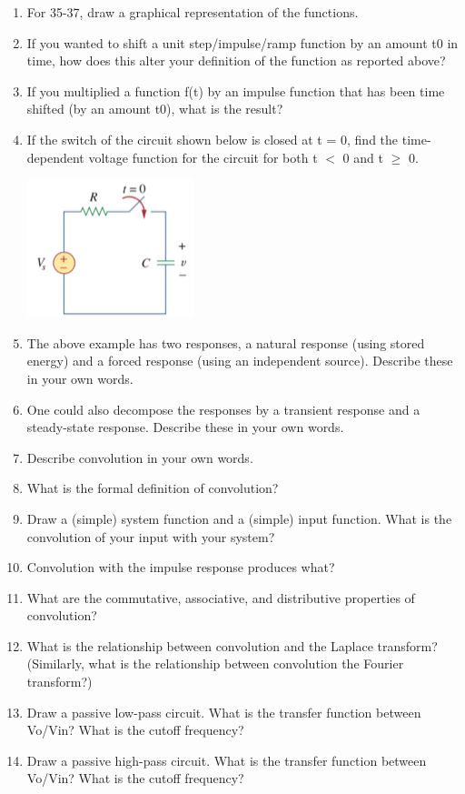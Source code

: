\documentclass[11pt]{book}
\begin{document}
\begin{enumerate}
	\item For 35-37, draw a graphical representation of the functions.
	\item If you wanted to shift a unit step/impulse/ramp function by an amount t0 in time, how does this alter your definition of the function as reported above?
	\item If you multiplied a function f(t) by an impulse function that has been time shifted (by an amount t0), what is the result? 
	\item If the switch of the circuit shown below is closed at t = 0, find the time-dependent voltage function for the circuit for both t $<$ 0 and t $\geq$ 0.
	\begin{center}\includegraphics{figures/q2.05.png}\end{center}
	\item The above example has two responses, a natural response (using stored energy) and a forced response (using an independent source). Describe these in your own words.
	\item One could also decompose the responses by a transient response and a steady-state response. Describe these in your own words.
	\item Describe convolution in your own words.
	\item What is the formal definition of convolution?
	\item Draw a (simple) system function and a (simple) input function. What is the convolution of your input with your system? 
	\item Convolution with the impulse response produces what?
	\item What are the commutative, associative, and distributive properties of convolution?
	\item What is the relationship between convolution and the Laplace transform? (Similarly, what is the relationship between convolution the Fourier transform?)
	\item Draw a passive low-pass circuit. What is the transfer function between Vo/Vin? What is the cutoff frequency?
	\item Draw a passive high-pass circuit. What is the transfer function between Vo/Vin? What is the cutoff frequency?

\end{enumerate}
\end{document}
